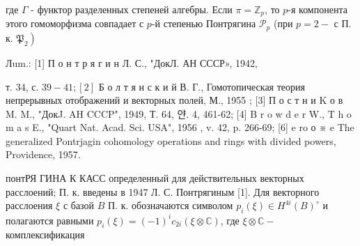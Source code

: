 \documentclass[10pt]{article}
\begin{document}
где $\Gamma$ - функтор разделенных степеней алгебры. Если $\pi=\mathbb{Z}_{p}$, то $p$-я компонента этого гомоморфизма совпадает с $p$-й степенью Понтрягина $\mathscr{P}_{p}$ (при $p=2-$ с П. к. $\left.\mathfrak{P}_{2}\right)$



Лum.: [1] П о н т р я г и н Л. С., "ДокЛ. АН СССР», 1942,

т. 34, с. $39-41 ;[2]$ Б о л т я н с к и й В. Г., Гомотопическая теория непрерывных отображений и векторных полей, М., 1955 ; [3] П о с т н и K о в M. M., "ДокJ. AH CCCP", 1949, Т. 64, 얀. 4, 461-62; [4] B r o w d e r W., T h o m a s E., "Quart Nat. Acad. Sci. USA", 1956 , v. 42, p. 266-69; [6] e ro $о$ ※ e The generalized Pontrjagin cohomology operations and rings with divided powers, Providence, 1957.



понтРЯ ГИНА К КАСС определенный для действительных векторных расслоений; П. к. введены в 1947 Л. С. Понтрягиным [1]. Для векторного расслоения $\xi$ с базой $B$ П. к. обозначаются символом $p_{i}(\xi) \in H^{4 i}(B)^{\circ}$ и полагаются равными $p_{i}(\xi)=(-1)^{i} c_{2 i}(\xi \otimes \mathbb{C})$, где $\xi \otimes \mathbb{C}-$ комплексификация
\end{document}
